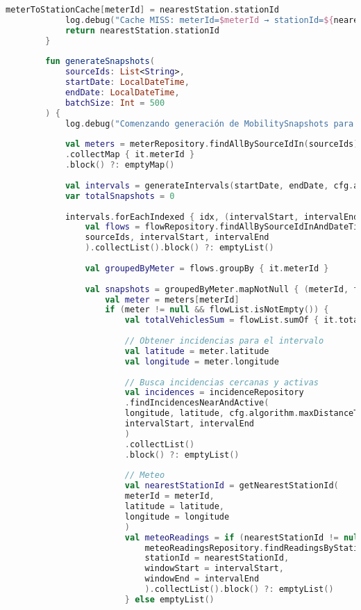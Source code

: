\begin{lstlisting}[language=Kotlin, caption={Clase MobilitySnapshotGeneratorService}]
			meterToStationCache[meterId] = nearestStation.stationId
			log.debug("Cache MISS: meterId=$meterId → stationId=${nearestStation.stationId}")
			return nearestStation.stationId
		}
		
		fun generateSnapshots(
			sourceIds: List<String>,
			startDate: LocalDateTime,
			endDate: LocalDateTime,
			batchSize: Int = 500
		) {
			log.debug("Comenzando generación de MobilitySnapshots para sourceIds=${sourceIds.joinToString(",")}, fechas entre '${DateTimeUtils.format(startDate)}' y '${DateTimeUtils.format(endDate)}'")
			
			val meters = meterRepository.findAllBySourceIdIn(sourceIds)
			.collectMap { it.meterId }
			.block() ?: emptyMap()
			
			val intervals = generateIntervals(startDate, endDate, cfg.algorithm.timeWindowDuration)
			var totalSnapshots = 0
			
			intervals.forEachIndexed { idx, (intervalStart, intervalEnd) ->
				val flows = flowRepository.findAllBySourceIdInAndDateTimeBetweenQuery(
				sourceIds, intervalStart, intervalEnd
				).collectList().block() ?: emptyList()
				
				val groupedByMeter = flows.groupBy { it.meterId }
				
				val snapshots = groupedByMeter.mapNotNull { (meterId, flowList) ->
					val meter = meters[meterId]
					if (meter != null && flowList.isNotEmpty()) {
						val totalVehiclesSum = flowList.sumOf { it.totalVehicles.toIntOrNull() ?: 0 }
						
						// Obtener incidencias para el intervalo
						val latitude = meter.latitude
						val longitude = meter.longitude
						
						// Busca incidencias cercanas y activas
						val incidences = incidenceRepository
						.findIncidencesNearAndActive(
						longitude, latitude, cfg.algorithm.maxDistanceToIncidences,
						intervalStart, intervalEnd
						)
						.collectList()
						.block() ?: emptyList()
						
						// Meteo
						val nearestStationId = getNearestStationId(
						meterId = meterId,
						latitude = latitude,
						longitude = longitude
						)
						val meteoReadings = if (nearestStationId != null) {
							meteoReadingsRepository.findReadingsByStationIdAndDateTimeBetween(
							stationId = nearestStationId,
							windowStart = intervalStart,
							windowEnd = intervalEnd
							).collectList().block() ?: emptyList()
						} else emptyList()
						

\end{lstlisting}

